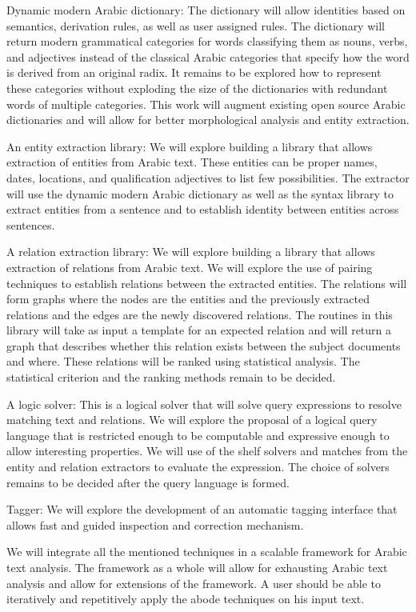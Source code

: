 \documentclass[12pt]{article}
\begin{document}
Dynamic modern Arabic dictionary: The dictionary will allow identities based on semantics,
 derivation rules,
 as well as user assigned rules.
 The dictionary will return modern grammatical categories for words classifying them as nouns,
 verbs,
 and adjectives instead of the classical Arabic categories that specify how the word is derived from an original radix.
 It remains to be explored how to represent these categories without exploding the size of the dictionaries with redundant words of multiple categories.
 This work will augment existing open source Arabic dictionaries and will allow for better morphological analysis and entity extraction.

An entity extraction library: We will explore building a library that allows extraction of entities from Arabic text.
 These entities can be proper names,
 dates,
 locations,
 and qualification adjectives to list few possibilities.
 The extractor will use the dynamic modern Arabic dictionary as well as the syntax library to extract entities from a sentence and to establish identity between entities across sentences.

A relation extraction library: We will explore building a library that allows extraction of relations from Arabic text.
 We will explore the use of pairing techniques to establish relations between the extracted entities.
 The relations will form graphs where the nodes are the entities and the previously extracted relations and the edges are the newly discovered relations.
 The routines in this library will take as input a template for an expected relation and will return a graph that describes whether this relation exists between the subject documents and where.
 These relations will be ranked using statistical analysis.
 The statistical criterion and the ranking methods remain to be decided.

A logic solver: This is a logical solver that will solve query expressions to resolve matching text and relations.
 We will explore the proposal of a logical query language that is restricted enough to be computable and expressive enough to allow interesting properties.
 We will use of the shelf solvers and matches from the entity and relation extractors to evaluate the expression.
 The choice of solvers remains to be decided after the query language is formed.
 
Tagger: We will explore the development of an automatic tagging interface that allows fast and guided inspection and correction mechanism.
 
We will integrate all the mentioned techniques in a scalable framework for Arabic text analysis.
 The framework as a whole will allow for exhausting Arabic text analysis and allow for extensions of the framework.
 A user should be able to iteratively and repetitively apply the abode techniques on his input text.
\end{document}
